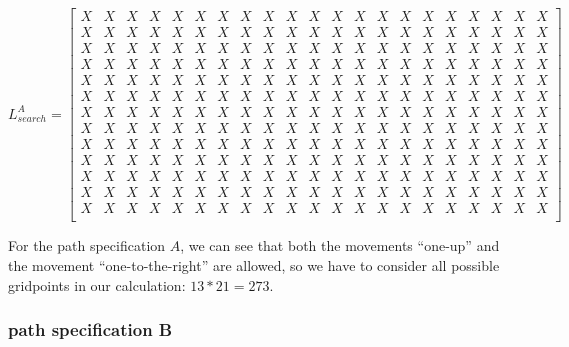 \[ L_{search}^A = 
\left[
\begin{array}{ccccccccccccccccccccc}
 X & X & X & X & X & X & X & X & X & X & X & X & X & X & X & X & X & X & X & X & X \\
 X & X & X & X & X & X & X & X & X & X & X & X & X & X & X & X & X & X & X & X & X \\
 X & X & X & X & X & X & X & X & X & X & X & X & X & X & X & X & X & X & X & X & X \\
 X & X & X & X & X & X & X & X & X & X & X & X & X & X & X & X & X & X & X & X & X \\
 X & X & X & X & X & X & X & X & X & X & X & X & X & X & X & X & X & X & X & X & X \\
 X & X & X & X & X & X & X & X & X & X & X & X & X & X & X & X & X & X & X & X & X \\
 X & X & X & X & X & X & X & X & X & X & X & X & X & X & X & X & X & X & X & X & X \\
 X & X & X & X & X & X & X & X & X & X & X & X & X & X & X & X & X & X & X & X & X \\
 X & X & X & X & X & X & X & X & X & X & X & X & X & X & X & X & X & X & X & X & X \\
 X & X & X & X & X & X & X & X & X & X & X & X & X & X & X & X & X & X & X & X & X \\
 X & X & X & X & X & X & X & X & X & X & X & X & X & X & X & X & X & X & X & X & X \\
 X & X & X & X & X & X & X & X & X & X & X & X & X & X & X & X & X & X & X & X & X \\
 X & X & X & X & X & X & X & X & X & X & X & X & X & X & X & X & X & X & X & X & X \\
\end{array}
\right]
\]

For the path specification $A$, we can see that both the movements ``one-up'' and the movement ``one-to-the-right'' are allowed, 
so we have to consider all possible gridpoints in our calculation: \textbf{$13*21=273$}.


\subsubsection*{path specification B} %
\label{ssub:path_specification_a}

